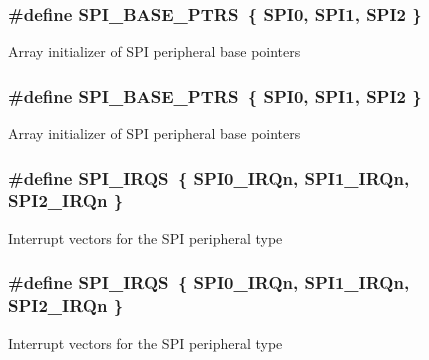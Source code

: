 \subsubsection[{\texorpdfstring{S\+P\+I\+\_\+\+B\+A\+S\+E\+\_\+\+P\+T\+RS}{SPI_BASE_PTRS}}]{\setlength{\rightskip}{0pt plus 5cm}\#define S\+P\+I\+\_\+\+B\+A\+S\+E\+\_\+\+P\+T\+RS~\{ {\bf S\+P\+I0}, {\bf S\+P\+I1}, {\bf S\+P\+I2} \}}\hypertarget{group__SPI__Peripheral__Access__Layer_ga3a16fecfe27c2052ab60e014be3f66f6}{}\label{group__SPI__Peripheral__Access__Layer_ga3a16fecfe27c2052ab60e014be3f66f6}
Array initializer of S\+PI peripheral base pointers 
\subsubsection[{\texorpdfstring{S\+P\+I\+\_\+\+B\+A\+S\+E\+\_\+\+P\+T\+RS}{SPI_BASE_PTRS}}]{\setlength{\rightskip}{0pt plus 5cm}\#define S\+P\+I\+\_\+\+B\+A\+S\+E\+\_\+\+P\+T\+RS~\{ {\bf S\+P\+I0}, {\bf S\+P\+I1}, {\bf S\+P\+I2} \}}\hypertarget{group__SPI__Peripheral__Access__Layer_ga3a16fecfe27c2052ab60e014be3f66f6}{}\label{group__SPI__Peripheral__Access__Layer_ga3a16fecfe27c2052ab60e014be3f66f6}
Array initializer of S\+PI peripheral base pointers 
\subsubsection[{\texorpdfstring{S\+P\+I\+\_\+\+I\+R\+QS}{SPI_IRQS}}]{\setlength{\rightskip}{0pt plus 5cm}\#define S\+P\+I\+\_\+\+I\+R\+QS~\{ {\bf S\+P\+I0\+\_\+\+I\+R\+Qn}, {\bf S\+P\+I1\+\_\+\+I\+R\+Qn}, {\bf S\+P\+I2\+\_\+\+I\+R\+Qn} \}}\hypertarget{group__SPI__Peripheral__Access__Layer_ga30fd955e8b934f6ea091b7476a020d59}{}\label{group__SPI__Peripheral__Access__Layer_ga30fd955e8b934f6ea091b7476a020d59}
Interrupt vectors for the S\+PI peripheral type 
\subsubsection[{\texorpdfstring{S\+P\+I\+\_\+\+I\+R\+QS}{SPI_IRQS}}]{\setlength{\rightskip}{0pt plus 5cm}\#define S\+P\+I\+\_\+\+I\+R\+QS~\{ {\bf S\+P\+I0\+\_\+\+I\+R\+Qn}, {\bf S\+P\+I1\+\_\+\+I\+R\+Qn}, {\bf S\+P\+I2\+\_\+\+I\+R\+Qn} \}}\hypertarget{group__SPI__Peripheral__Access__Layer_ga30fd955e8b934f6ea091b7476a020d59}{}\label{group__SPI__Peripheral__Access__Layer_ga30fd955e8b934f6ea091b7476a020d59}
Interrupt vectors for the S\+PI peripheral type 